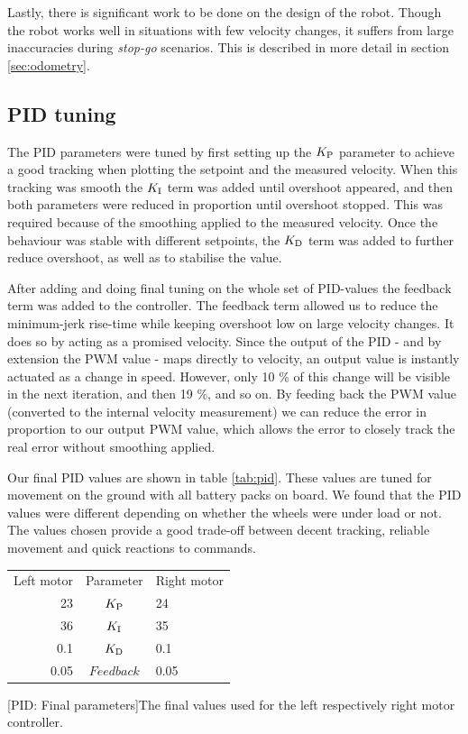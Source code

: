 \documentclass[11pt]{article}
\begin{document}
Lastly, there is significant work to be done on the design of the robot. Though
the robot works well in situations with few velocity changes, it suffers from
large inaccuracies during \emph{stop-go} scenarios. This is described in more
detail in section \vref{sec:odometry}.
\subsection{PID tuning}
\label{subsec:pidt}
The PID parameters were tuned by first setting up the ${K_{\textup{P}}}$ parameter to
achieve a good tracking when plotting the setpoint and the measured
velocity. When this tracking was smooth the ${K_{\textup{I}}}$ term was added until
overshoot appeared, and then both parameters were reduced in proportion until
overshoot stopped. This was required because of the smoothing applied to the
measured velocity. Once the behaviour was stable with different setpoints, the
${K_{\textup{D}}}$ term was added to further reduce overshoot, as well as to stabilise
the value. \par

After adding and doing final tuning on the whole set of PID-values the feedback
term was added to the controller. The feedback term allowed us to reduce the
minimum-jerk rise-time while keeping overshoot low on large velocity changes. It
does so by acting as a promised velocity. Since the output of the PID - and by
extension the PWM value - maps directly to velocity, an output value is
instantly actuated as a change in speed. However, only 10 \% of this change will
be visible in the next iteration, and then 19 \%, and so on. By feeding back the
PWM value (converted to the internal velocity measurement) we can reduce the
error in proportion to our output PWM value, which allows the error to closely
track the real error without smoothing applied. \par

Our final PID values are shown in table \vref{tab:pid}. These values are tuned
for movement on the ground with all battery packs on board. We found that the
PID values were different depending on whether the wheels were under load or
not. The values chosen provide a good trade-off between decent tracking,
reliable movement and quick reactions to commands. \par
\begin{center}
  
\begin{tabular}{r|c|l}
  Left motor & Parameter & Right motor \\
  23  & ${K_{\textup{P}}}$ & 24 \\
  36  & ${K_{\textup{I}}}$ & 35 \\
  0.1  & ${K_{\textup{D}}}$ & 0.1 \\
  0.05  & $Feedback$ & 0.05 \\
\end{tabular}
[PID: Final parameters]{The final values used for the left
  respectively right motor controller. \label{tab:pid}}

\end{center}
\end{document}
